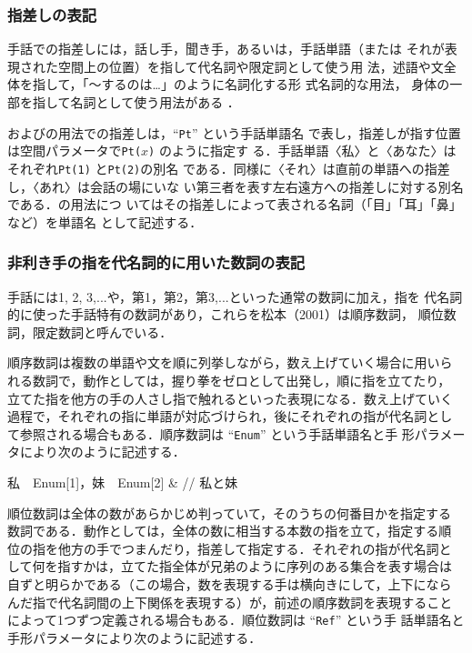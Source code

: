 \subsubsection*{指差しの表記}

手話での指差しには，話し手，聞き手，あるいは，手話単語（または
それが表現された空間上の位置）を指して代名詞や限定詞として使う用
法，述語や文全体を指して，「〜するのは…」のように名詞化する形
式名詞的な用法， 身体の一部を指して名詞として使う用法がある
\cite{Matsumoto2001,Kanda1996}．

およびの用法での指差しは，``{\tt Pt}'' という手話単語名
で表し，指差しが指す位置は空間パラメータで{\tt Pt($x$)} のように指定す
る．手話単語〈私〉と〈あなた〉はそれぞれ{\tt Pt(1)} と{\tt Pt(2)}の別名
である．同様に〈それ〉は直前の単語への指差し，〈あれ〉は会話の場にいな
い第三者を表す左右遠方への指差しに対する別名である．の用法につ
いてはその指差しによって表される名詞（「目」「耳」「鼻」など）を単語名
として記述する．

\subsubsection*{非利き手の指を代名詞的に用いた数詞の表記}

手話には1, 2, 3,...や，第1，第2，第3,...といった通常の数詞に加え，指を
代名詞的に使った手話特有の数詞があり，これらを松本（2001）は順序数詞，
順位数詞，限定数詞と呼んでいる．

順序数詞は複数の単語や文を順に列挙しながら，数え上げていく場合に用いら
れる数詞で，動作としては，握り拳をゼロとして出発し，順に指を立てたり，
立てた指を他方の手の人さし指で触れるといった表現になる．数え上げていく
過程で，それぞれの指に単語が対応づけられ，後にそれぞれの指が代名詞とし
て参照される場合もある．順序数詞は ``{\tt Enum}'' という手話単語名と手
形パラメータにより次のように記述する．

\begin{ex}
私　Enum[1]，妹　Enum[2] & // 私と妹
\end{ex}

順位数詞は全体の数があらかじめ判っていて，そのうちの何番目かを指定する
数詞である．動作としては，全体の数に相当する本数の指を立て，指定する順
位の指を他方の手でつまんだり，指差して指定する．それぞれの指が代名詞と
して何を指すかは，立てた指全体が兄弟のように序列のある集合を表す場合は
自ずと明らかである（この場合，数を表現する手は横向きにして，上下になら
んだ指で代名詞間の上下関係を表現する）が，前述の順序数詞を表現すること
によって1つずつ定義される場合もある．順位数詞は ``{\tt Ref}'' という手
話単語名と手形パラメータにより次のように記述する．

